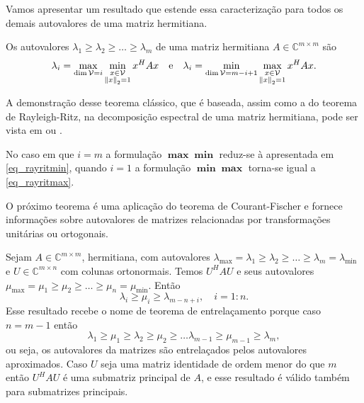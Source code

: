 Vamos apresentar um resultado que estende essa caracterização para todos os demais autovalores de uma matriz hermitiana.
\begin{teore}\label{teo_courantfisher}
Os autovalores $\lambda_1\geqslant\lambda_2\geqslant\ldots\geqslant\lambda_m$  de uma matriz hermitiana $A\in\mathbb{C}^{m\times m}$ são
\[
  \lambda_i=\max_{\dim\mathcal{V}=i}\min_{\begin{subarray}{c}x\in\mathcal{V}\\{\Vert x\Vert}_2=1\end{subarray}} x^HAx\quad\text{e}\quad\lambda_i=\min_{\dim\mathcal{V}=m-i+1}\max_{\begin{subarray}{c}x\in\mathcal{V}\\{\Vert x\Vert}_2=1\end{subarray}} x^HAx.
\]
\end{teore}
A demonstração desse teorema clássico, que é baseada, assim como a do teorema de Rayleigh-Ritz, na decomposição espectral de uma matriz hermitiana, pode ser vista em \cite[pág. 179]{HornJohnson87Matrix} ou \cite[pág. 550]{Meyer00Matrix}.
\begin{obs}\label{obs_courafisch}
No caso em que $i=m$ a formulação $\mathbf{\max\min}$ reduz-se à apresentada em \eqref{eq_rayritmin}, quando $i=1$ a formulação $\mathbf{\min\max}$ torna-se igual a \eqref{eq_rayritmax}.
\end{obs}

O pr\'{o}ximo teorema é uma aplicação do teorema de Courant-Fischer e fornece informações sobre autovalores de matrizes relacionadas por transformaç\~{o}es unitárias ou ortogonais.
\begin{teore}\label{teo_interlacing}
Sejam $A\in\mathbb{C}^{m\times m}$, hermitiana, com autovalores $\lambda_{\max}=\lambda_1\geqslant\lambda_2\geqslant\ldots\geqslant\lambda_m=\lambda_{\min}$ e $U\in\mathbb{C}^{m\times n}$  com colunas ortonormais. Temos $U^HAU$ e seus autovalores $\mu_{\max}=\mu_1\geqslant\mu_2\geqslant\ldots\geqslant\mu_n=\mu_{\min}$. Então
\[
\lambda_i\geqslant \mu_i \geqslant \lambda_{m-n+i}, \quad i=1:n.
\]
Esse resultado recebe o nome de teorema de entrelaçamento porque caso $n=m-1$ então
\[
\lambda_1\geqslant\mu_1\geqslant\lambda_2\geqslant\mu_2\geqslant\ldots\lambda_{m-1}\geqslant\mu_{m-1}\geqslant\lambda_m,
\]
ou seja, os autovalores da matrizes são entrelaçados pelos autovalores aproximados. Caso $U$ seja uma matriz identidade de ordem menor do que $m$ então $U^HAU$ é uma submatriz principal de $A$, e esse resultado é válido também para submatrizes principais.
\end{teore}

